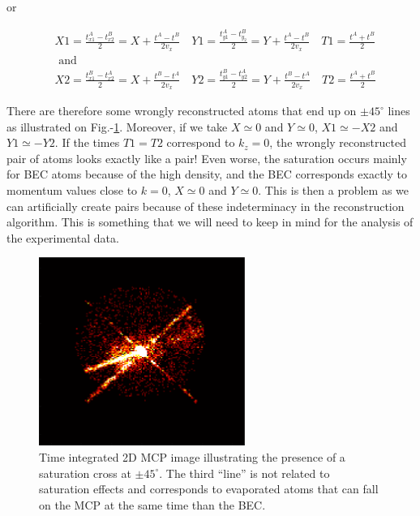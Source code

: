 \noindent or 

\begin{equation}
\begin{aligned}
&X 1=\frac{t_{x 1}^{A}-t_{x 2}^{B}}{2}=X+\frac{t^{A}-t^{B}}{2 v_{x}} \quad Y 1=\frac{t_{y 1}^{A}-t_{y_{2}}^{B}}{2}=Y+\frac{t^{A}-t^{B}}{2 v_{x}} \quad T 1=\frac{t^{A}+t^{B}}{2}\\
&\text { and }\\
&X 2=\frac{t_{x 1}^{B}-t_{x 2}^{A}}{2}=X+\frac{t^{B}-t^{A}}{2 v_{x}} \quad Y 2=\frac{t_{y 1}^{B}-t_{y 2}^{A}}{2}=Y+\frac{t^{B}-t^{A}}{2 v_{x}} \quad T 2=\frac{t^{A}+t^{B}}{2}
\end{aligned}
\end{equation}

There are therefore some wrongly reconstructed atoms that end up on $\pm 45^{\circ}$ lines as illustrated on Fig.-\ref{fig:saturation_cross}. Moreover, if we take $X \simeq 0$ and $Y \simeq 0$, $X1 \simeq -X2$ and $Y1 \simeq -Y2$. If the times $T1=T2$ correspond to $k_z=0$, the wrongly reconstructed pair of atoms looks exactly like a \kmk pair! Even worse, the saturation occurs mainly for BEC atoms because of the high density, and the BEC corresponds exactly to momentum values close to $k=0$, \ie  $X \simeq 0$ and $Y \simeq 0$. This is then a problem as we can artificially create \kmk pairs because of these indeterminacy in the reconstruction algorithm. This is something that we will need to keep in mind for the analysis of the experimental data.

\begin{figure}
    \centering
    \includegraphics[width=0.6\textwidth]{Fig/Chapter3/saturation_cross.png}
    \caption[Saturation cross]{Time integrated 2D MCP image illustrating the presence of a saturation cross at $\pm 45^{\circ}$. The third ``line'' is not related to saturation effects and corresponds to evaporated atoms that can fall on the MCP at the same time than the BEC.}
    \label{fig:saturation_cross}
\end{figure}


